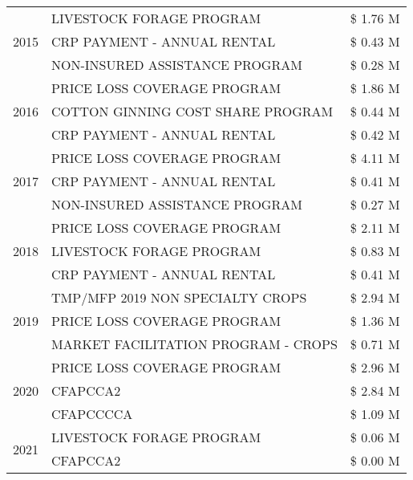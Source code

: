 \begin{tabular}{llr}
\cline{1-3}
\multirow[t]{3}{*}{2015} & LIVESTOCK FORAGE PROGRAM & \$ 1.76 M \\
 & CRP PAYMENT - ANNUAL RENTAL & \$ 0.43 M \\
 & NON-INSURED ASSISTANCE PROGRAM & \$ 0.28 M \\
\cline{1-3}
\multirow[t]{3}{*}{2016} & PRICE LOSS COVERAGE PROGRAM & \$ 1.86 M \\
 & COTTON GINNING COST SHARE PROGRAM & \$ 0.44 M \\
 & CRP PAYMENT - ANNUAL RENTAL & \$ 0.42 M \\
\cline{1-3}
\multirow[t]{3}{*}{2017} & PRICE LOSS COVERAGE PROGRAM & \$ 4.11 M \\
 & CRP PAYMENT - ANNUAL RENTAL & \$ 0.41 M \\
 & NON-INSURED ASSISTANCE PROGRAM & \$ 0.27 M \\
\cline{1-3}
\multirow[t]{3}{*}{2018} & PRICE LOSS COVERAGE PROGRAM & \$ 2.11 M \\
 & LIVESTOCK FORAGE PROGRAM & \$ 0.83 M \\
 & CRP PAYMENT - ANNUAL RENTAL & \$ 0.41 M \\
\cline{1-3}
\multirow[t]{3}{*}{2019} & TMP/MFP 2019 NON SPECIALTY CROPS & \$ 2.94 M \\
 & PRICE LOSS COVERAGE PROGRAM & \$ 1.36 M \\
 & MARKET FACILITATION PROGRAM - CROPS & \$ 0.71 M \\
\cline{1-3}
\multirow[t]{3}{*}{2020} & PRICE LOSS COVERAGE PROGRAM & \$ 2.96 M \\
 & CFAPCCA2 & \$ 2.84 M \\
 & CFAPCCCCA & \$ 1.09 M \\
\cline{1-3}
\multirow[t]{2}{*}{2021} & LIVESTOCK FORAGE PROGRAM & \$ 0.06 M \\
 & CFAPCCA2 & \$ 0.00 M \\
\cline{1-3}
\bottomrule
\end{tabular}
